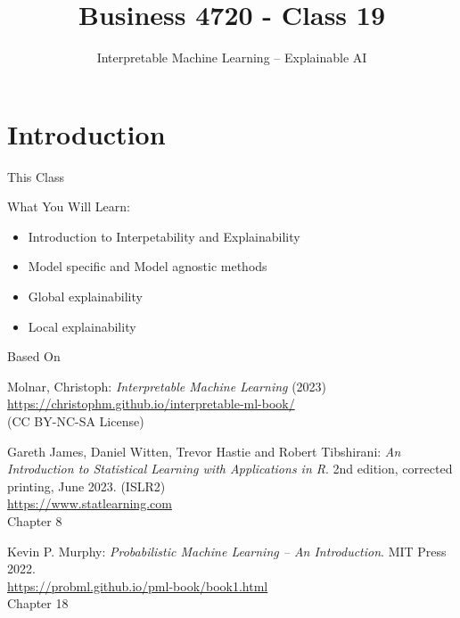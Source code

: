 \documentclass[ignorenonframetext,xcolor=x11names]{beamer}
\title{Business 4720 - Class 19}
\subtitle{Interpretable Machine Learning -- Explainable AI}
\begin{document}
\begin{frame}{}
  \titlepage
  \footnotesize
  
\end{frame}

\section{Introduction}

\begin{frame}{This Class}

\begin{block}{What You Will Learn:}
\begin{itemize}
  \item Introduction to Interpetability and Explainability
  \item Model specific and Model agnostic methods
  \item Global explainability
  \item Local explainability
\end{itemize}
\end{block}
\end{frame}

\begin{frame}{Based On}

\begin{block}{}
Molnar, Christoph: \emph{Interpretable Machine Learning} (2023) \\
\vspace{1mm}
\small
\url{https://christophm.github.io/interpretable-ml-book/} \\
\normalsize
\vspace{1mm}
(CC BY-NC-SA License)
\end{block}

\begin{block}{}
Gareth James, Daniel Witten, Trevor Hastie and Robert Tibshirani: \emph{An Introduction to Statistical Learning with Applications in R}. 2nd edition, corrected printing, June 2023. (ISLR2) \\
\vspace{1mm}
\small
\url{https://www.statlearning.com} \\
\normalsize
\vspace{1mm}
Chapter 8
\end{block}

\begin{block}{}
Kevin P. Murphy: \emph{Probabilistic Machine Learning -- An Introduction}. MIT Press 2022. \\
\vspace{1mm}
\small
\url{https://probml.github.io/pml-book/book1.html} \\
\normalsize
\vspace{1mm}
Chapter 18
\end{block}
\end{frame}
\end{document}
